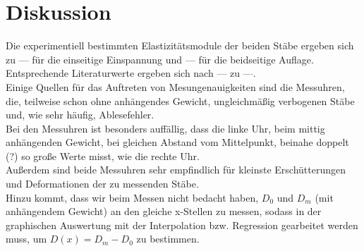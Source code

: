 \section{Diskussion}
\label{sec:Diskussion}

Die experimentiell bestimmten Elastizitätsmodule der beiden Stäbe ergeben sich zu --- für die 
einseitige Einspannung und --- für die beidseitige Auflage. \\
Entsprechende Literaturwerte ergeben sich nach --- zu ---.\\

Einige Quellen für das Auftreten von Mesungenauigkeiten sind die Messuhren, die, teilweise 
schon ohne anhängendes Gewicht, ungleichmäßig verbogenen Stäbe und, wie sehr häufig, Ablesefehler.\\
Bei den Messuhren ist besonders auffällig, dass die linke Uhr, beim mittig anhängenden Gewicht, 
bei gleichen Abstand vom Mittelpunkt, beinahe doppelt (?) so große Werte misst, wie die rechte Uhr.\\
Außerdem sind beide Messuhren sehr empfindlich für kleinste Erschütterungen und Deformationen der zu 
messenden Stäbe.\\
Hinzu kommt, dass wir beim Messen nicht bedacht haben, $D_0$ und $D_m$ (mit anhängendem Gewicht)
an den gleiche x-Stellen zu messen, sodass in der graphischen Auswertung mit der Interpolation 
bzw. Regression gearbeitet werden muss, um $D(x) = D_m - D_0$ zu bestimmen.